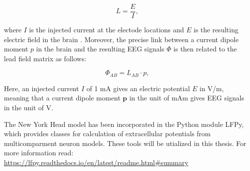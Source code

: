 \documentclass[a4paper, UKenglish, 11pt]{uiomaster}
\begin{document}
\begin{equation}
L = \frac{E}{I},
\label{eq:R2}
\end{equation}

where $I$ is the injected current at the electode locations and $E$ is the resulting electric field in the brain \cite{naess2021biophysically}. Moreover, the precise link between a current dipole moment $p$ in the brain and the resulting EEG signals $\Phi$ is then related to the lead field matrix as follows:

\begin{equation}
\Phi_{AB} = L_{AB} \cdot p,
\label{eq:EEG_signal}
\end{equation}

Here, an injected current $I$ of 1 mA gives an electric potential $E$ in V/m, meaning that a current dipole moment $\textbf{p}$ in the unit of mAm gives EEG signals in the unit of V.


The New York Head model has been incorporated in the Python module LFPy, which provides classes for calculation of extracellular potentials from multicomparment neuron models. These tools will be utialized in this thesis. For more information read: \url{https://lfpy.readthedocs.io/en/latest/readme.html#summary}


\end{document}
